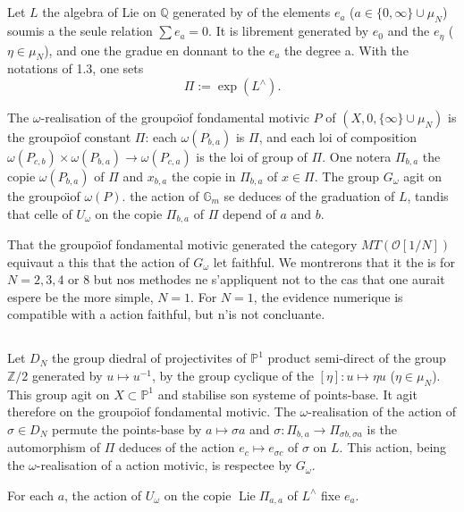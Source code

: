 \documentclass[11pt,a4paper]{article}
\theoremstyle{plain}
\theoremstyle{definition}
\DeclareMathOperator{\Lie}{Lie}
\newcommand{\Di}{D}
\newcommand{\Gm}{\mathbb{G}_m}
\newcommand{\Q}{\mathbb{Q}}
\newcommand{\Z}{\mathbb{Z}}
\newcommand{\Pone}{\mathbb{P}^1}
\begin{document}
\subsection{}
Let $L$ the algebra of Lie on $\Q$ generated by of the elements $e_a$ ($a \in \{0, \infty\} \cup \mu_N$) soumis a the seule relation $\sum e_a = 0$. It is librement generated by $e_0$ and the $e_\eta$ ($\eta \in \mu_N$), and one the gradue en donnant to the $e_a$ the degree a. With the notations of 1.3, one sets
\[
\Pi := \exp(L^{\wedge}).
\]

The $\omega$-realisation of the groupo\"{\i}of fondamental motivic $P$ of $(X, 0, \{\infty\} \cup \mu_N)$ is the groupo\"{\i}of constant $\Pi$: each $\omega(P_{b,a})$ is $\Pi$, and each loi of composition $\omega(P_{c,b}) \times \omega(P_{b,a}) \to \omega(P_{c,a})$ is the loi of group of $\Pi$. One notera $\Pi_{b,a}$ the copie $\omega(P_{b,a})$ of $\Pi$ and $x_{b,a}$ the copie in $\Pi_{b,a}$ of $x \in \Pi$. The group $G_\omega$ agit on the groupo\"{\i}of $\omega(P)$. the action of $\Gm$ se deduces of the graduation of $L$, tandis that celle of $U_\omega$ on the copie $\Pi_{b,a}$ of $\Pi$ depend of $a$ and $b$.

That the groupo\"{\i}of fondamental motivic generated the category $MT(\mathcal{O}[1/N])$ equivaut a this that the action of $G_\omega$ let faithful. We montrerons that it the is for $N=2,3,4$ or $8$ but nos methodes ne s'appliquent not to the cas that one aurait espere be the more simple, $N=1$. For $N=1$, the evidence numerique is compatible with a action faithful, but n'is not concluante.

\subsection{}
Let $\Di_N$ the group diedral of projectivites of $\Pone$ product semi-direct of the group $\Z/2$ generated by $u \mapsto u^{-1}$, by the group cyclique of the $[\eta]: u \mapsto \eta u$ ($\eta \in \mu_N$). This group agit on $X \subset \Pone$ and stabilise son systeme of points-base. It agit therefore on the groupo\"{\i}of fondamental motivic. The $\omega$-realisation of the action of $\sigma \in \Di_N$ permute the points-base by $a \mapsto \sigma a$ and $\sigma: \Pi_{b,a} \to \Pi_{\sigma b, \sigma a}$ is the automorphism of $\Pi$ deduces of the action $e_c \mapsto e_{\sigma c}$ of $\sigma$ on $L$. This action, being the $\omega$-realisation of a action motivic, is respectee by $G_\omega$.

For each $a$, the action of $U_\omega$ on the copie $\Lie \Pi_{a,a}$ of $L^{\wedge}$ fixe $e_a$.
\end{document}
